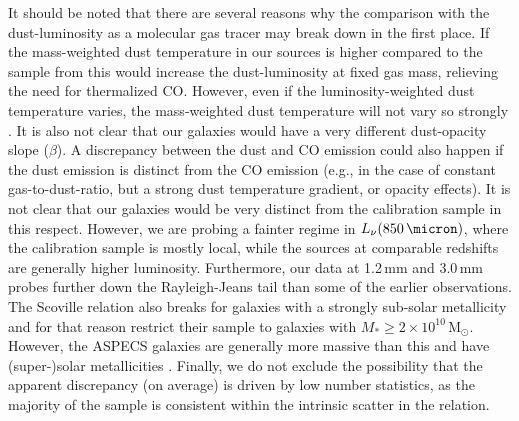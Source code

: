 \documentclass[twocolumn]{aastex62}
\newcommand{\solarmass}{\ensuremath{\mathrm{M}_{\odot}}}
\newcommand{\Msun}{\solarmass}
\begin{document}
It should be noted that there are several reasons why the comparison with the
dust-luminosity as a molecular gas tracer may break down in the first place.
If the mass-weighted dust temperature in our sources is higher compared to the
sample from \cite{Scoville2016} this would increase the dust-luminosity at
fixed gas mass, relieving the need for thermalized CO.  However, even if the
luminosity-weighted dust temperature varies, the mass-weighted dust temperature
will not vary so strongly \citep{Scoville2016}.  It is also not clear that our
galaxies would have a very different dust-opacity slope ($\beta$).  A
discrepancy between the dust and CO emission could also happen if the dust
emission is distinct from the CO emission (e.g., in the case of constant
gas-to-dust-ratio, but a strong dust temperature gradient, or opacity effects).
It is not clear that our galaxies would be very distinct from the calibration
sample in this respect.  However, we are probing a fainter regime in
$L_{\nu}(850\,\micron)$, where the calibration sample is mostly local, while
the sources at comparable redshifts are generally higher luminosity.
Furthermore, our data at 1.2\,mm and 3.0\,mm probes further down the
Rayleigh-Jeans tail than some of the earlier observations.  The Scoville
relation also breaks for galaxies with a strongly sub-solar metallicity and for
that reason \cite{Scoville2016} restrict their sample to galaxies with
$M_{*} \ge 2\times 10^{10}$\,\Msun.  However, the ASPECS galaxies are generally
more massive than this and have (super-)solar metallicities
\citep{Boogaard2019}.  Finally, we do not exclude the possibility that the
apparent discrepancy (on average) is driven by low number statistics, as the
majority of the sample is consistent within the intrinsic scatter in the
relation.
\end{document}
